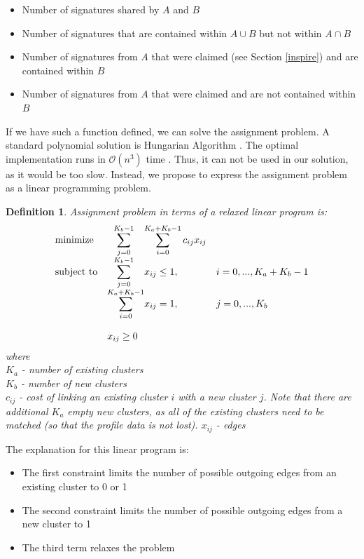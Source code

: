 \documentclass{pracamgr}
\newtheorem{mydef}{Definition}
\begin{document}
\begin{itemize}
\item{Number of signatures shared by $A$ and $B$}
\item{Number of signatures that are contained within $A \cup B$ but not within
$A \cap B$}
\item{Number of signatures from $A$ that were claimed (see Section \ref{inspire}) and
are contained within $B$}
\item{Number of signatures from $A$ that were claimed and
are not contained within $B$}
\end{itemize}

If we have such a function defined, we can solve the assignment problem. A standard
polynomial solution is Hungarian Algorithm \citep{kuhn}. The optimal implementation runs in
$\mathcal{O}(n^3)$ time \citep{tomizawa}. Thus, it can not be used in our solution,
as it would be too slow. Instead, we propose to express the assignment problem
as a linear programming problem.

\begin{mydef}
Assignment problem in terms of a relaxed linear program is:
\begin{equation*}
\begin{array}{ll@{}ll}
\text{minimize}  & \ \ \displaystyle\sum\limits_{j=0}^{K_{b}-1} &\displaystyle\sum\limits_{i=0}^{K_{a} + K_{b} - 1} c_{ij}x_{ij} &\\
\text{subject to}& \ \ \displaystyle\sum\limits_{j=0}^{K_{b}-1}   &x_{ij} \leq 1,  &i=0 ,..., K_{a} + K_{b} - 1\\
                 & \displaystyle\sum\limits_{i=0}^{K_{a} + K_{b} - 1}                                               &x_{ij} = 1, &j=0 ,..., K_{b}\\
                 \\
                 & x_{ij} \geq 0 &
\end{array}
\end{equation*}
where \\
$K_{a}$ - number of existing clusters \\
$K_{b}$ - number of new clusters \\
$c_{ij}$ - cost of linking an existing cluster $i$ with a new cluster $j$. Note that there are
additional $K_{a}$ empty new clusters, as all of the existing clusters need to be matched (so
that the profile data is not lost). 
$x_{ij}$ - edges
\end{mydef}

The explanation for this linear program is:
\begin{itemize}
\item{The first constraint limits the number of possible outgoing edges from an existing cluster
to 0 or 1}
\item{The second constraint limits the number of possible outgoing edges from a new cluster
to 1}
\item{The third term relaxes the problem}
\end{itemize}
\end{document}
